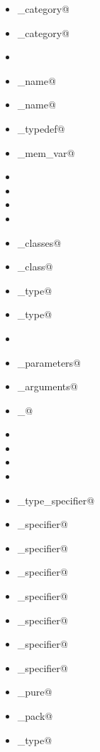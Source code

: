 \begin{minipage}[t]{0.5\textwidth}
\begin{itemize}
\item \verb@metaobject_category@
\item \verb@specifier_category@
\item \verb@keyword@
\item \verb@base_name@
\item \verb@full_name@
\item \verb@named_typedef@
\item \verb@named_mem_var@
\item \verb@scope@
\item \verb@members@
\item \verb@overloads@
\item \verb@type@
\item \verb@base_classes@
\item \verb@base_class@
\item \verb@base_type@
\item \verb@result_type@
\item \verb@parameters@
\item \verb@template_parameters@
\end{itemize}
\end{minipage}
\begin{minipage}[t]{0.5\textwidth}
\begin{itemize}
\item \verb@template_arguments@
\item \verb@template_@
\item \verb@exceptions@
\item \verb@instantiation@
\item \verb@position@
\item \verb@value@
\item \verb@elaborated_type_specifier@
\item \verb@access_specifier@
\item \verb@constexpr_specifier@
\item \verb@noexcept_specifier@
\item \verb@const_specifier@
\item \verb@inheritance_specifier@
\item \verb@linkage_specifier@
\item \verb@storage_specifier@
\item \verb@is_pure@
\item \verb@is_pack@
\item \verb@original_type@
\end{itemize}
\end{minipage}

